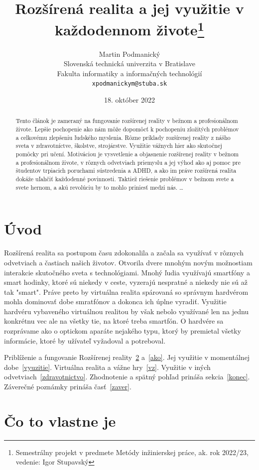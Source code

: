 \documentclass[10pt,twoside,a4paper]{article}
\title{Rozšírená realita a jej využitie v každodennom živote\thanks{Semestrálny projekt v predmete Metódy inžinierskej práce, ak. rok 2022/23, vedenie: Igor Stupavský}} %
\author{Martin Podmanický\\[2pt]
	{\small Slovenská technická univerzita v Bratislave}\\
	{\small Fakulta informatiky a informačných technológií}\\
	{\small \texttt{xpodmanickym@stuba.sk}}
	}
\date{\small 18. október 2022} %
\begin{document}
\maketitle

\begin{abstract}
Tento článok je zameraný na fungovanie rozšírenej reality v bežnom a profesionálnom živote. Lepšie pochopenie ako nám môže dopomôcť k pochopeniu zložitých problémov a celkovému zlepšeniu ľudského myslenia. Rôzne príklady rozšírenej reality z nášho sveta v zdravotníctve, školstve, strojárstve. Využitie vážnych hier ako skutočnej pomôcky pri učení. Motiváciou je vysvetlenie a objasnenie rozšírenej reality v bežnom a profesionálnom živote, v rôznych odvetviach priemyslu a jej výhod ako aj pomoc pre študentov trpiacich poruchami sústredenia a ADHD, a ako im práve rozšírená realita dokáže uľahčiť každodenné povinnosti. Taktiež riešenie problémov v bežnom svete a svete hernom, a akú revolúciu by to mohlo priniesť medzi nás.
\ldots
\end{abstract}



\section{Úvod}
\par Rozšírená realita sa postupom času zdokonalila a začala sa využívať v rôznych odvetviach a častiach našich životov. Otvorila dvere mnohým novým možnostiam interakcie skutočného sveta s technológiami. Mnohý ľudia využívajú smartfóny a smart hodinky, ktoré sú niekedy v ceste, vyzerajú nespratné a niekedy nie sú až tak "smart". Práve preto by virtuálna realita spárovaná so správnym hardvérom mohla dominovať dobe smratfónov a dokonca ich úplne vyradiť. Využitie hardvéru vybaveného virtuálnou realitou by však nebolo využívané len na jednu konkrétnu vec ale na všetky tie, na ktoré treba smartfón. O hardvére sa rozprávame ako o optickom aparáte nejakého typu, ktorý by premietal všetky informácie, ktoré by užívateľ vyžadoval a potreboval.


Priblíženie a fungovanie Rozšírenej reality~\ref{co} a~\ref{ako}.
Jej využitie v momentálnej dobe~\ref{vyuzitie}.
Virtuálna realita a vážne hry~\ref{vz}.
Využitie v iných odvetviach~\ref{zdravotnictvo}.
Zhodnotenie a spätný pohľad prináša sekcia~\ref{konec}.
Záverečné poznámky prináša časť~\ref{zaver}.



\section{Čo to vlastne je} \label{co}
\end{document}

